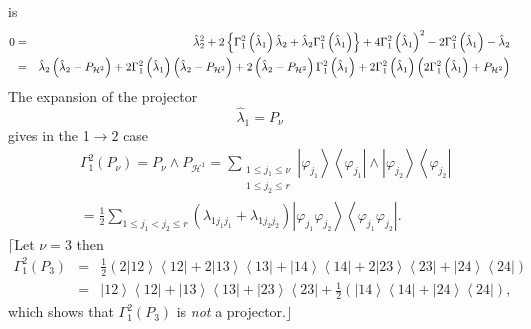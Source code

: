 \documentclass[12pt]{article}
\begin{document}
is 
\begin{eqnarray*}
0 &=&\hat{\lambda}_{2}^{2}+2\left\{ \Gamma _{1}^{2}\left( \hat{\lambda}%
_{1}\right) \hat{\lambda}_{2}+\hat{\lambda}_{2}\Gamma _{1}^{2}\left( \hat{%
\lambda}_{1}\right) \right\} +4\Gamma _{1}^{2}\left( \hat{\lambda}%
_{1}\right) ^{2}-2\Gamma _{1}^{2}\left( \hat{\lambda}_{1}\right) -\hat{%
\lambda}_{2} \\
&=&\hat{\lambda}_{2}\left( \hat{\lambda}_{2}-P_{\mathcal{H}^{2}}\right)
+2\Gamma _{1}^{2}\left( \hat{\lambda}_{1}\right) \left( \hat{\lambda}_{2}-P_{%
\mathcal{H}^{2}}\right) +2\left( \hat{\lambda}_{2}-P_{\mathcal{H}%
^{2}}\right) \Gamma _{1}^{2}\left( \hat{\lambda}_{1}\right) +2\Gamma
_{1}^{2}\left( \hat{\lambda}_{1}\right) \left( 2\Gamma _{1}^{2}\left( \hat{%
\lambda}_{1}\right) +P_{\mathcal{H}^{2}}\right)
\end{eqnarray*}%
The expansion of the projector 
\begin{equation*}
\hat{\lambda}_{1}=P_{\mathcal{\nu }}
\end{equation*}%
gives in the 1$\rightarrow 2$ case 
\begin{align*}
& \Gamma _{1}^{2}\left( P_{\mathcal{\nu }}\right) =P_{\mathcal{\nu }}\wedge
P_{\mathcal{H}^{1}}=\sum_{\substack{ 1\leq j_{1}\leq \nu  \\ 1\leq j_{2}\leq
r}}\left\vert \varphi _{j_{1}}\right\rangle \left\langle \varphi
_{j_{1}}\right\vert \wedge \left\vert \varphi _{j_{2}}\right\rangle
\left\langle \varphi _{j_{2}}\right\vert \\
& =\frac{1}{2}\sum_{1\leq j_{1}<j_{2}\leq r}\left( \lambda
_{1j_{1}j_{1}}+\lambda _{1j_{2}j_{2}}\right) \left\vert \varphi
_{j_{1}}\varphi _{j_{2}}\right\rangle \left\langle \varphi _{j_{1}}\varphi
_{j_{2}}\right\vert .
\end{align*}%
$\lceil $Let $\nu =3$ then 
\begin{eqnarray*}
\Gamma _{1}^{2}\left( P_{3}\right) &=&\frac{1}{2}\left( 2\left\vert
12\right\rangle \left\langle 12\right\vert +2\left\vert 13\right\rangle
\left\langle 13\right\vert +\left\vert 14\right\rangle \left\langle
14\right\vert +2\left\vert 23\right\rangle \left\langle 23\right\vert
+\left\vert 24\right\rangle \left\langle 24\right\vert \right) \\
&=&\left\vert 12\right\rangle \left\langle 12\right\vert +\left\vert
13\right\rangle \left\langle 13\right\vert +\left\vert 23\right\rangle
\left\langle 23\right\vert +\frac{1}{2}\left( \left\vert 14\right\rangle
\left\langle 14\right\vert +\left\vert 24\right\rangle \left\langle
24\right\vert \right) ,
\end{eqnarray*}%
which shows that $\Gamma _{1}^{2}\left( P_{3}\right) $ is \emph{not} a
projector.$\rfloor $
\end{document}
